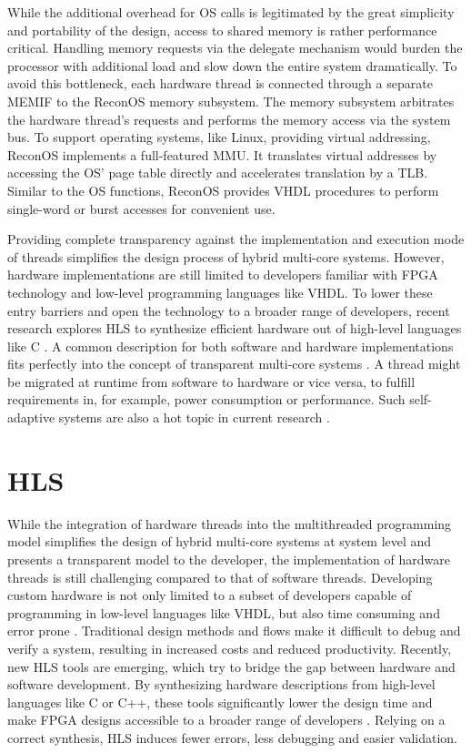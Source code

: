 While the additional overhead for \ac{OS} calls is legitimated by the great
simplicity and portability of the design, access to shared memory is rather
performance critical. Handling memory requests via the delegate mechanism
would burden the processor with additional load and slow down the entire
system dramatically. To avoid this bottleneck, each hardware thread is
connected through a separate \ac{MEMIF} to the ReconOS memory subsystem. The
memory subsystem arbitrates the hardware thread's requests and performs the
memory access via the system bus. To support operating systems, like Linux,
providing virtual addressing, ReconOS implements a full-featured \ac{MMU}. It
translates virtual addresses by accessing the \ac{OS}' page table directly and
accelerates translation by a \ac{TLB}. Similar to the \ac{OS} functions,
ReconOS provides \ac{VHDL} procedures to perform single-word or burst accesses
for convenient use.

Providing complete transparency against the implementation and execution mode
of threads simplifies the design process of hybrid multi-core systems.
However, hardware implementations are still limited to developers familiar
with \ac{FPGA} technology and low-level programming languages like \ac{VHDL}.
To lower these entry barriers and open the technology to a broader range of
developers, recent research explores \ac{HLS} to synthesize efficient hardware
out of high-level languages like C \citep{SWL13}. A common description for
both software and hardware implementations fits perfectly into the concept of
transparent multi-core systems \citep{CBN11}. A thread might be migrated at
runtime from software to hardware or vice versa, to fulfill requirements in,
for example, power consumption or performance. Such self-adaptive systems are
also a hot topic in current research \citep{AHL14,HLP09}.

\section{\acl{HLS}}
While the integration of hardware threads into the multithreaded programming
model simplifies the design of hybrid multi-core systems at system level and
presents a transparent model to the developer, the implementation of hardware
threads is still challenging compared to that of software threads. Developing
custom hardware is not only limited to a subset of developers capable of
programming in low-level languages like \ac{VHDL}, but also time consuming and
error prone \citep{SWL13}. Traditional design methods and flows make it
difficult to debug and verify a system, resulting in increased costs and
reduced productivity. Recently, new \ac{HLS} tools are emerging, which try to
bridge the gap between hardware and software development. By synthesizing
hardware descriptions from high-level languages like C or C++, these tools
significantly lower the design time and make \ac{FPGA} designs accessible to a
broader range of developers \citep{PeTh05}. Relying on a correct synthesis,
\ac{HLS} induces fewer errors, less debugging and easier validation.

